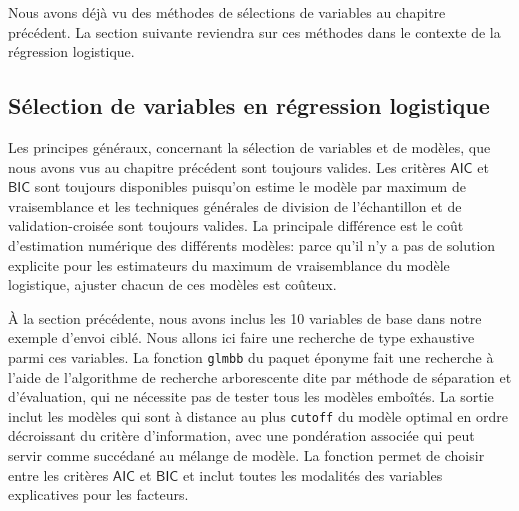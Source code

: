 \documentclass[
  11pt,
  letterpaper,
]{book}
\theoremstyle{definition}
\theoremstyle{remark}
\begin{document}
Nous avons déjà vu des méthodes de sélections de variables au chapitre
précédent. La section suivante reviendra sur ces méthodes dans le
contexte de la régression logistique.

\hypertarget{suxe9lection-de-variables-en-ruxe9gression-logistique}{%
\subsection{Sélection de variables en régression
logistique}\label{suxe9lection-de-variables-en-ruxe9gression-logistique}}

Les principes généraux, concernant la sélection de variables et de
modèles, que nous avons vus au chapitre précédent sont toujours valides.
Les critères \(\mathsf{AIC}\) et \(\mathsf{BIC}\) sont toujours
disponibles puisqu'on estime le modèle par maximum de vraisemblance et
les techniques générales de division de l'échantillon et de
validation-croisée sont toujours valides. La principale différence est
le coût d'estimation numérique des différents modèles: parce qu'il n'y a
pas de solution explicite pour les estimateurs du maximum de
vraisemblance du modèle logistique, ajuster chacun de ces modèles est
coûteux.

À la section précédente, nous avons inclus les 10 variables de base dans
notre exemple d'envoi ciblé. Nous allons ici faire une recherche de type
exhaustive parmi ces variables. La fonction \texttt{glmbb} du paquet
éponyme fait une recherche à l'aide de l'algorithme de recherche
arborescente dite par méthode de séparation et d'évaluation, qui ne
nécessite pas de tester tous les modèles emboîtés. La sortie inclut les
modèles qui sont à distance au plus \texttt{cutoff} du modèle optimal en
ordre décroissant du critère d'information, avec une pondération
associée qui peut servir comme succédané au mélange de modèle. La
fonction permet de choisir entre les critères \(\mathsf{AIC}\) et
\(\mathsf{BIC}\) et inclut toutes les modalités des variables
explicatives pour les facteurs.
\end{document}
